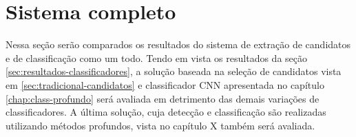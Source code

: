 \section{Sistema completo}
Nessa seção serão comparados os resultados do sistema de extração de candidatos e de classificação como um todo. Tendo em vista os resultados da seção \ref{sec:resultados-classificadores}, a solução baseada na seleção de candidatos vista em \ref{sec:tradicional-candidatos} e classificador CNN apresentada no capítulo \ref{chap:class-profundo} será avaliada em detrimento das demais variações de classificadores. A última solução, cuja detecção e classificação são realizadas utilizando métodos profundos, vista no capítulo X também será avaliada.
